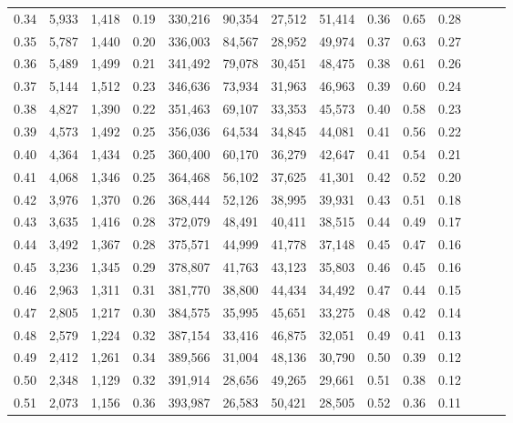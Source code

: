 \begin{tabular}{rrrrrrrrrrrrrr}
0.34 &   5,933 &  1,418 &  0.19 &  330,216 &   90,354 &  27,512 &  51,414 &  0.36 &  0.65 &      0.28 \\
0.35 &   5,787 &  1,440 &  0.20 &  336,003 &   84,567 &  28,952 &  49,974 &  0.37 &  0.63 &      0.27 \\
0.36 &   5,489 &  1,499 &  0.21 &  341,492 &   79,078 &  30,451 &  48,475 &  0.38 &  0.61 &      0.26 \\
0.37 &   5,144 &  1,512 &  0.23 &  346,636 &   73,934 &  31,963 &  46,963 &  0.39 &  0.60 &      0.24 \\
0.38 &   4,827 &  1,390 &  0.22 &  351,463 &   69,107 &  33,353 &  45,573 &  0.40 &  0.58 &      0.23 \\
0.39 &   4,573 &  1,492 &  0.25 &  356,036 &   64,534 &  34,845 &  44,081 &  0.41 &  0.56 &      0.22 \\
0.40 &   4,364 &  1,434 &  0.25 &  360,400 &   60,170 &  36,279 &  42,647 &  0.41 &  0.54 &      0.21 \\
0.41 &   4,068 &  1,346 &  0.25 &  364,468 &   56,102 &  37,625 &  41,301 &  0.42 &  0.52 &      0.20 \\
0.42 &   3,976 &  1,370 &  0.26 &  368,444 &   52,126 &  38,995 &  39,931 &  0.43 &  0.51 &      0.18 \\
0.43 &   3,635 &  1,416 &  0.28 &  372,079 &   48,491 &  40,411 &  38,515 &  0.44 &  0.49 &      0.17 \\
0.44 &   3,492 &  1,367 &  0.28 &  375,571 &   44,999 &  41,778 &  37,148 &  0.45 &  0.47 &      0.16 \\
0.45 &   3,236 &  1,345 &  0.29 &  378,807 &   41,763 &  43,123 &  35,803 &  0.46 &  0.45 &      0.16 \\
0.46 &   2,963 &  1,311 &  0.31 &  381,770 &   38,800 &  44,434 &  34,492 &  0.47 &  0.44 &      0.15 \\
0.47 &   2,805 &  1,217 &  0.30 &  384,575 &   35,995 &  45,651 &  33,275 &  0.48 &  0.42 &      0.14 \\
0.48 &   2,579 &  1,224 &  0.32 &  387,154 &   33,416 &  46,875 &  32,051 &  0.49 &  0.41 &      0.13 \\
0.49 &   2,412 &  1,261 &  0.34 &  389,566 &   31,004 &  48,136 &  30,790 &  0.50 &  0.39 &      0.12 \\
0.50 &   2,348 &  1,129 &  0.32 &  391,914 &   28,656 &  49,265 &  29,661 &  0.51 &  0.38 &      0.12 \\
0.51 &   2,073 &  1,156 &  0.36 &  393,987 &   26,583 &  50,421 &  28,505 &  0.52 &  0.36 &      0.11 \\

\end{tabular}

